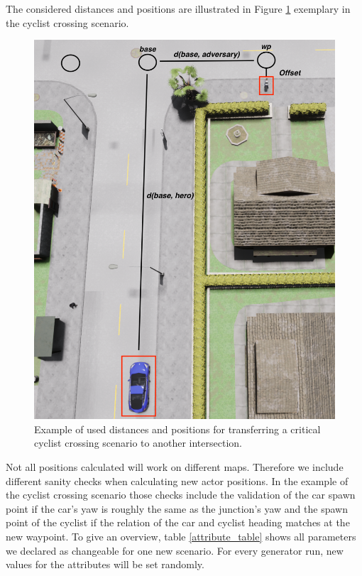 \documentclass[conference, a4paper, 11pt]{IEEEtran}
\begin{document}
The considered distances and positions are illustrated  in Figure \ref{fig:distances_carla} exemplary in the cyclist crossing scenario.

\begin{figure}[ht]
	\centering
	\includegraphics[width=\linewidth]{figures/carla_distances.png}
	\caption{Example of used distances and positions for transferring a critical cyclist crossing scenario to another intersection. }
	\label{fig:distances_carla}
\end{figure}

Not all positions calculated will work on different maps. Therefore we include different sanity checks when calculating new actor positions. In the example of the cyclist crossing scenario those checks include the validation of the car spawn point if the car's yaw is roughly the same as the junction's yaw and the spawn point of the cyclist  if the relation of the car and cyclist heading matches at the new waypoint.
To give an overview, table \ref{attribute_table} shows all parameters we declared as changeable for one new scenario. For every generator run, new values for the attributes will be set randomly.
\end{document}

